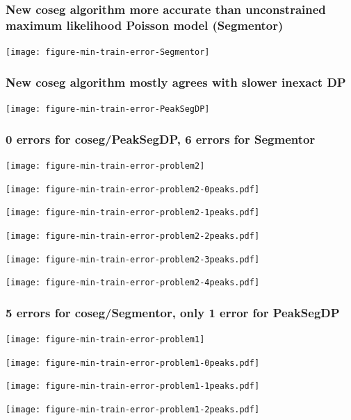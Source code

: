 \documentclass{beamer}
\begin{document}
\begin{frame}
  \frametitle{New coseg algorithm more accurate than unconstrained
    maximum likelihood Poisson model (Segmentor)}
  \texttt{[image: figure-min-train-error-Segmentor]}
\end{frame}

\begin{frame}
  \frametitle{New coseg algorithm mostly agrees with slower inexact DP}
  \texttt{[image: figure-min-train-error-PeakSegDP]}
\end{frame}

\begin{frame}
  \frametitle{0 errors for coseg/PeakSegDP, 6 errors for Segmentor}
  \texttt{[image: figure-min-train-error-problem2]}
\end{frame}

\begin{frame}
  \texttt{[image: figure-min-train-error-problem2-0peaks.pdf]}
\end{frame}

\begin{frame}
  \texttt{[image: figure-min-train-error-problem2-1peaks.pdf]}
\end{frame}

\begin{frame}
  \texttt{[image: figure-min-train-error-problem2-2peaks.pdf]}
\end{frame}

\begin{frame}
  \texttt{[image: figure-min-train-error-problem2-3peaks.pdf]}
\end{frame}

\begin{frame}
  \texttt{[image: figure-min-train-error-problem2-4peaks.pdf]}
\end{frame}

\begin{frame}
  \frametitle{5 errors for coseg/Segmentor, only 1 error for PeakSegDP}
  \texttt{[image: figure-min-train-error-problem1]}
\end{frame}


\begin{frame}
  \texttt{[image: figure-min-train-error-problem1-0peaks.pdf]}
\end{frame}

\begin{frame}
  \texttt{[image: figure-min-train-error-problem1-1peaks.pdf]}
\end{frame}

\begin{frame}
  \texttt{[image: figure-min-train-error-problem1-2peaks.pdf]}
\end{frame}
\end{document}
